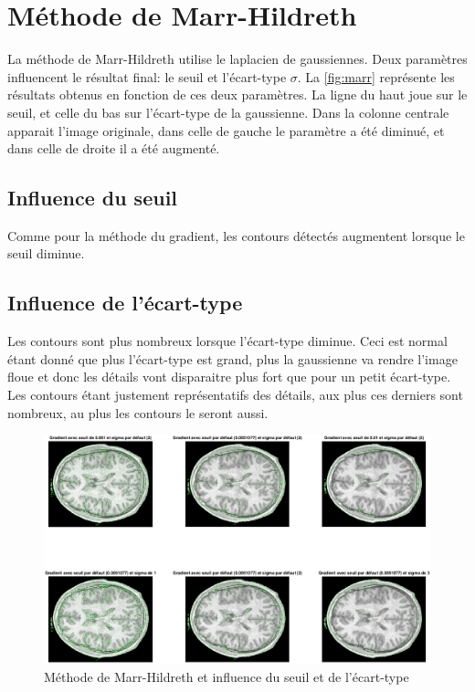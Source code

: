 \documentclass[12pt]{article}
\begin{document}
\section{Méthode de Marr-Hildreth}
La méthode de Marr-Hildreth utilise le laplacien de gaussiennes. Deux paramètres influencent le résultat final: le seuil et l'écart-type $\sigma$. La \autoref{fig:marr} représente les résultats obtenus en fonction de ces deux paramètres. La ligne du haut joue sur le seuil, et celle du bas sur l'écart-type de la gaussienne. Dans la colonne centrale apparait l'image originale, dans celle de gauche le paramètre a été diminué, et dans celle de droite il a été augmenté.

\subsection{Influence du seuil}
Comme pour la méthode du gradient, les contours détectés augmentent lorsque le seuil diminue.

\subsection{Influence de l'écart-type}
Les contours sont plus nombreux lorsque l'écart-type diminue. Ceci est normal étant donné que plus l'écart-type est grand, plus la gaussienne va rendre l'image floue et donc les détails vont disparaitre plus fort que pour un petit écart-type. Les contours étant justement représentatifs des détails, aux plus ces derniers sont nombreux, au plus les contours le seront aussi.

\begin{figure}[!h]
  \centering
  \includegraphics[width = \textwidth]{marr}
  \caption{Méthode de Marr-Hildreth et influence du seuil et de l'écart-type}
  \label{fig:marr}
\end{figure}
\end{document}
